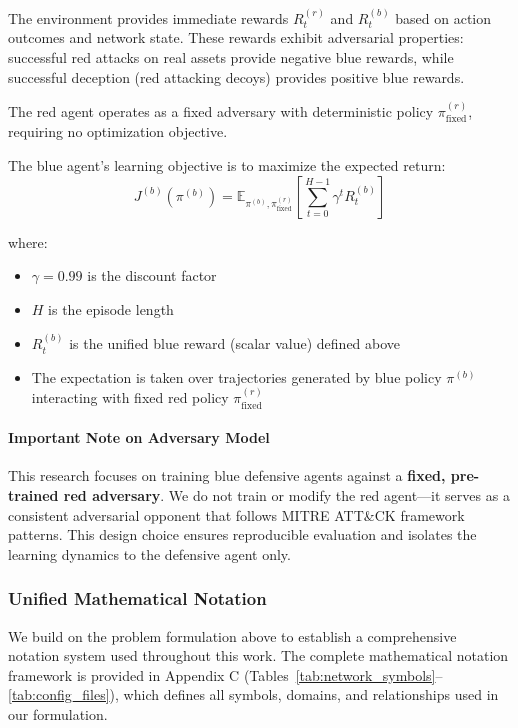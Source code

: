 \documentclass[12pt,oneside]{article}
\begin{document}
The environment provides immediate rewards $R_t^{(r)}$ and $R_t^{(b)}$ based on action outcomes and network state. These rewards exhibit adversarial properties: successful red attacks on real assets provide negative blue rewards, while successful deception (red attacking decoys) provides positive blue rewards.

The red agent operates as a fixed adversary with deterministic policy $\pi^{(r)}_{\text{fixed}}$, requiring no optimization objective.

The blue agent's learning objective is to maximize the expected return:
\begin{equation}
J^{(b)}(\pi^{(b)}) = \mathbb{E}_{\pi^{(b)}, \pi^{(r)}_{\text{fixed}}}\left[\sum_{t=0}^{H-1} \gamma^t R_t^{(b)}\right]
\end{equation}

where:
\begin{itemize}
\item $\gamma = 0.99$ is the discount factor
\item $H$ is the episode length 
\item $R_t^{(b)}$ is the unified blue reward (scalar value) defined above
\item The expectation is taken over trajectories generated by blue policy $\pi^{(b)}$ interacting with fixed red policy $\pi^{(r)}_{\text{fixed}}$
\end{itemize}

\paragraph{Important Note on Adversary Model} This research focuses on training blue defensive agents against a \textbf{fixed, pre-trained red adversary}. We do not train or modify the red agent—it serves as a consistent adversarial opponent that follows MITRE ATT\&CK framework patterns. This design choice ensures reproducible evaluation and isolates the learning dynamics to the defensive agent only.

\subsubsection{Unified Mathematical Notation}

We build on the problem formulation above to establish a comprehensive notation system used throughout this work. The complete mathematical notation framework is provided in Appendix C (Tables~\ref{tab:network_symbols}--\ref{tab:config_files}), which defines all symbols, domains, and relationships used in our formulation.
\end{document}
